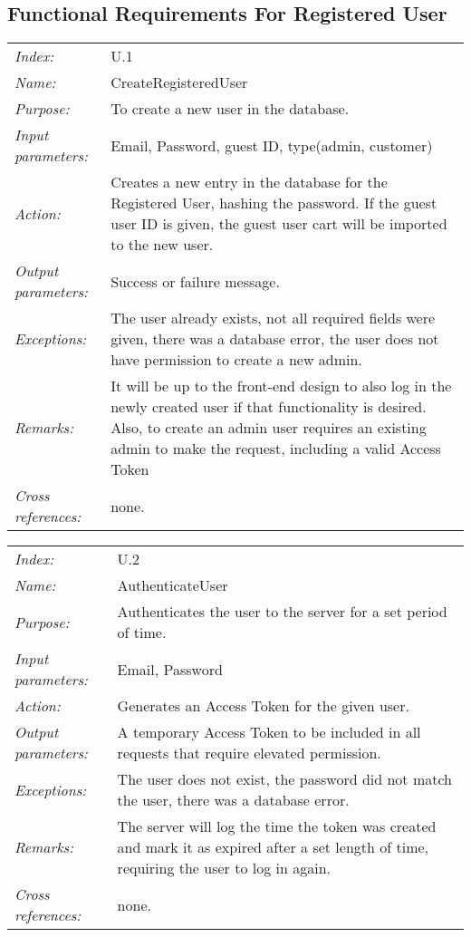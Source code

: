 \documentclass[10pt,letter]{article}
\begin{document}
\subsection{Functional Requirements For Registered User}

\begin{tabularx}{\textwidth}{l X}
    \it{Index:} & U.1 \\
    \it{Name:} & CreateRegisteredUser \\
    \it{Purpose:} & To create a new user in the database. \\
    \it{Input parameters:} & Email, Password, guest ID, type(admin, customer)\\
    \it{Action:} & Creates a new entry in the database for the Registered User, hashing the password. If the guest 
    user ID is given, the guest user cart will be imported to the new user.\\
    \it{Output parameters:} & Success or failure message. \\
    \it{Exceptions:} & The user already exists, not all required fields were given, there 
    was a database error, the user does not have permission to create a new admin. \\
    \it{Remarks:} & It will be up to the front-end design to also log in the newly created 
    user if that functionality is desired. Also, to create an admin user requires an existing admin
    to make the request, including a valid Access Token\\
    \it{Cross references:} & none. \\
    \hline
\end{tabularx}

\begin{tabularx}{\textwidth}{l X}
    \it{Index:} & U.2 \\
    \it{Name:} & AuthenticateUser \\
    \it{Purpose:} & Authenticates the user to the server for a set period of time. \\
    \it{Input parameters:} & Email, Password \\
    \it{Action:} & Generates an Access Token for the given user. \\
    \it{Output parameters:} & A temporary Access Token to be included in all requests that require elevated permission. \\
    \it{Exceptions:} & The user does not exist, the password did not match the user, there was a database error. \\
    \it{Remarks:} & The server will log the time the token was created and mark it as expired after a set length of time, 
    requiring the user to log in again. \\
    \it{Cross references:} & none. \\
    \hline
\end{tabularx}
\end{document}

